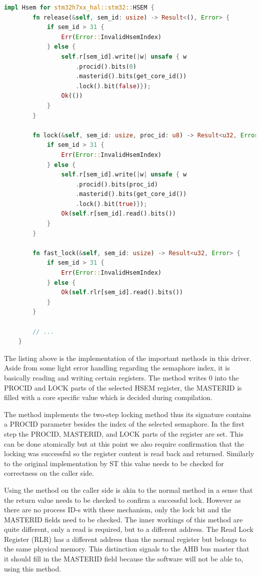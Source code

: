 \begin{lstlisting}[language=Rust,frame=single,float=!ht,style=customrust,label={lst:hsem-impl},caption={HSEM Method Implementations}]
    impl Hsem for stm32h7xx_hal::stm32::HSEM {
        fn release(&self, sem_id: usize) -> Result<(), Error> {
            if sem_id > 31 {
                Err(Error::InvalidHsemIndex)
            } else {
                self.r[sem_id].write(|w| unsafe { w
                    .procid().bits(0)
                    .masterid().bits(get_core_id())
                    .lock().bit(false)});
                Ok(())
            }
        }

        fn lock(&self, sem_id: usize, proc_id: u8) -> Result<u32, Error> {
            if sem_id > 31 {
                Err(Error::InvalidHsemIndex)
            } else {
                self.r[sem_id].write(|w| unsafe { w
                    .procid().bits(proc_id)
                    .masterid().bits(get_core_id())
                    .lock().bit(true)});
                Ok(self.r[sem_id].read().bits())
            }
        }

        fn fast_lock(&self, sem_id: usize) -> Result<u32, Error> {
            if sem_id > 31 {
                Err(Error::InvalidHsemIndex)
            } else {
                Ok(self.rlr[sem_id].read().bits())
            }
        }

        // ...
    }
\end{lstlisting}

The listing above is the implementation of the important methods in this driver. Aside from some light error handling regarding the semaphore index, it is basically reading and writing certain registers. The  method writes 0 into the PROCID and LOCK parts of the selected HSEM register, the MASTERID is filled with a core specific value which is decided during compilation.

The  method implements the two-step locking method thus its signature contains a PROCID parameter besides the index of the selected semaphore. In the first step the PROCID, MASTERID, and LOCK parts of the register are set. This can be done atomically but at this point we also require confirmation that the locking was successful so the register content is read back and returned. Similarly to the original implementation by ST this value needs to be checked for correctness on the caller side.

Using the  method on the caller side is akin to the normal  method in a sense that the return value needs to be checked to confirm a successful lock. However as there are no process ID-s with these mechanism, only the lock bit and the MASTERID fields need to be checked. The inner workings of this method are quite different, only a read is required, but to a different address. The Read Lock Register (RLR) has a different address than the normal register but belongs to the same physical memory. This distinction signals to the AHB bus master that it should fill in the MASTERID field because the software will not be able to, using this method.

